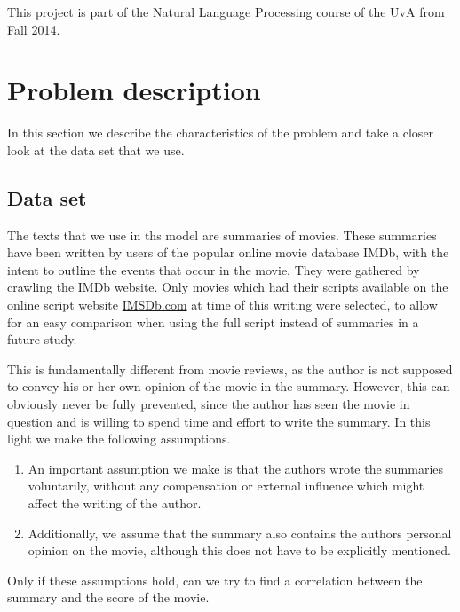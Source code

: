 \documentclass{article} %
\begin{document}
This project is part of the Natural Language Processing course of the UvA from Fall 2014.

\section{Problem description}
\label{sec:problem}
In this section we describe the characteristics of the problem and take a closer look at the data set that we use.


\subsection{Data set}
The texts that we use in ths model are summaries of movies.
These summaries have been written by users of the popular online movie database IMDb, with the intent to outline the events that occur in the movie.
They were gathered by crawling the IMDb website.
Only movies which had their scripts available on the online script website \url{IMSDb.com} \cite{IMSDb} at time of this writing were selected, to allow for an easy comparison when using the full script instead of summaries in a future study.

This is fundamentally different from movie reviews, as the author is not supposed to convey his or her own opinion of the movie in the summary.
However, this can obviously never be fully prevented, since the author has seen the movie in question and is willing to spend time and effort to write the summary.
In this light we make the following assumptions.

\begin{enumerate}
  \item An important assumption we make is that the authors wrote the summaries voluntarily, without any compensation or external influence which might affect the writing of the author.
  \item Additionally, we assume that the summary also contains the authors personal opinion on the movie, although this does not have to be explicitly mentioned.
\end{enumerate}
Only if these assumptions hold, can we try to find a correlation between the summary and the score of the movie.
\end{document}
